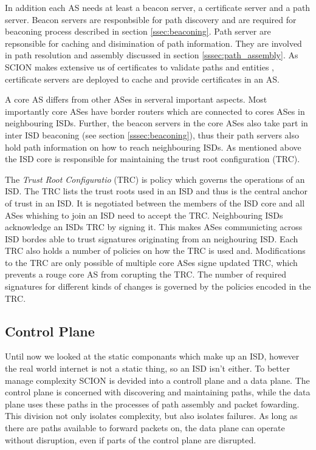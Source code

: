 \documentclass[../eva1_scion.tex]{subfiles}
\begin{document}
    In addition each AS needs at least a beacon server, a certificate server and a path server. Beacon servers are responbsible for path discovery and are required for beaconing process described in section \ref{ssec:beaconing}. Path server are repsonsible for caching and disimination of path information. They are involved in path resolution and assembly discussed in section \ref{sssec:path_assembly}. As SCION makes extensive us of certificates to validate paths and entities \cite{scion_2011}, certificate servers are deployed to cache and provide certificates in an AS.

    A core AS differs from other ASes in serveral important aspects. Most importantly core ASes have border routers which are connected to cores ASes in neighbouring ISDs. Further, the beacon servers in the core ASes also take part in inter ISD beaconing (see section \ref{sssec:beaconing}), thus their path servers also hold path information on how to reach neighbouring ISDs. As mentioned above the ISD core is responsible for maintaining the trust root configuration (TRC).

    The \textit{Trust Root Configuratio} (TRC) is policy which governs the operations of an ISD. The TRC lists the trust roots used in an ISD and thus is the central anchor of trust in an ISD. It is negotiated between the members of the ISD core and all ASes whishing to join an ISD need to accept the TRC. Neighbouring ISDs acknowledge an ISDs TRC by signing it. This makes ASes communicting across ISD bordes able to trust signatures originating from an neighouring ISD. Each TRC also holds a number of policies on how the TRC is used and. Modifications to the TRC are only possible of multiple core ASes signe updated TRC, which prevents a rouge core AS from corupting the TRC. The number of required signatures for different kinds of changes is governed by the policies encoded in the TRC.

    \subsection{Control Plane} \label{ssec:control_plane}
    Until now we looked at the static componants which make up an ISD, however the real world internet is not a static thing, so an ISD isn't either. To better manage complexity SCION is devided into a controll plane and a data plane. The control plane is concerned with discovering and maintaining paths, while the data plane uses these paths in the processes of path assembly and packet fowarding. This division not only isolates complexity, but also isolates failures. As long as there are paths available to forward packets on, the data plane can operate without disruption, even if parts of the control plane are disrupted.
\end{document}
